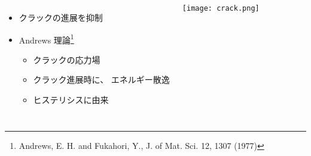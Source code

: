 \begin{columns}[totalwidth=\textwidth]
        \begin{itemize}
            \item クラックの進展を\alert{抑制}
            \item Andrews 理論\footnote{
                \scriptsize
        {Andrews, E. H. and Fukahori, Y., J. of Mat. Sci. 12, 1307 (1977)}
            }
                \begin{itemize}
                    \item クラックの応力場
                    \item クラック進展時に、{\color{red} エネルギー散逸}
                    \item \alert{ヒステリシスに由来}
                \end{itemize}	
        \end{itemize}
        \texttt{[image: crack.png]}     
\end{columns}

